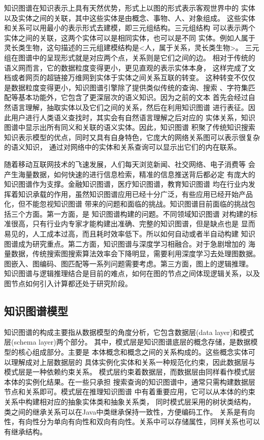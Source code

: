 \documentclass{standalone}
\begin{document}
知识图谱在知识表示上具有天然优势，形式上以图的形式表示客观世界中的
实体以及实体之间的关联，其中这些实体是由概念、事物、人、对象组成。
这些实体和关系可以用最小的表示形式去建模，即三元组结构。三元组结构
可以表示两个实体之间的关联，这两个实体可以是相同实体，也可以是不同
实体。例如人属于灵长类生物，这句描述的三元组建模结构是<人，属于关系，灵长类生物>。
三元组在图谱中的呈现形式就是对应两个点，关系则是它们之间的边。
相对于传统的语义网而言，它的数据粒度变得更小，更见直观的表示实体本身，
这样完成了文档或者网页的超链接万维网到实体于实体之间关系互联的转变。
这种转变不仅仅是数据粒度变得更小，知识图谱引擎除了提供类似传统的查询、搜索
、字符集匹配等基本功能外，它包含了更深层次的语义知识。因为之前的文本
首先会经过自然语言理解，抽取实体以及它们之间的关系，然后在利用知识图谱
进行表征。因此用户进行人类语义查找时，其实会有自然语言理解之后对应的
实体关系，知识图谱中显示出所有同义和关联的语义实体。因此，知识图谱
积聚了传统知识搜索知识表示模型的优点，同时又具有自身特色，它庞大的网络关系图可以表示很复杂的语义知识，
通过对网络中的实体和关系查询可以显示出它们的内在联系。

随着移动互联网技术的飞速发展，人们每天浏览新闻、社交网络、电子消费等
会产生海量数据，如何快速的进行信息检索，精准的信息推送背后都必定
有庞大的知识图谱作为支撑。金融知识图谱，医疗知识图谱，教育知识图谱
均在行业内发挥着知识承载的作用，虽然知识图谱应用已经十分广泛，有些应用已经开始产品化，但不能忽视知识图谱
带来的问题和面临的挑战。知识图谱目前面临的挑战包括三个方面。第一方面，是
知识图谱构建的问题。不同领域知识图谱
对构建的标准很高，只有行业内专家才能构建出准确、完整的知识图谱，但是缺点也是
显而易见的，人工成本过高，而且耗时效率低下。所以如何自动或者半自动构建
知识图谱成为研究重点。第二方面，知识图谱与深度学习相融合。对于急剧增加的
海量数据，传统搜索图搜索算法效率会下降明显，需要利用深度学习去处理图数据。
图嵌入、图编码、图匹配等一系列问题需要考虑。第三方面，图上的逻辑推理。
知识图谱与逻辑推理结合是目前的难点，如何在图的节点之间体现逻辑关系，以及
图节点如何引入计算都还处于研究阶段。
\subsection{知识图谱模型}
知识图谱的构成主要指从数据模型的角度分析，它包含数据层(data layer)和模式层(schema layer)两个部分。
其中，模式层是知识图谱底层的概念存储，是数据模型的核心组成部分。主要是
本体概念和概念之间的关系构成的。这些概念实体可以理解成对上层数据层的
具体实例化实体和关系一种规范化约束，因此数据层与模式层是一种依赖约束关系。
模式层约束着数据层，而数据层由同样看作模式层本体的实例化结果。在一些只承担
搜索查询的知识图谱中，通常只需构建数据层节点和关系即可。模式层在推理知识图谱
中有着重要应用，它可以从本体的约束关系中构建相对应的抽象实体类和抽象关系类，
同时模式层采用的树状类结构，类之间的继承关系可以在Java中类继承保持一致性，方便编码工作。
关系是有向性，有向性分为单向有向性和双向有向性。关系中可以存储属性，同样关系也可以
有继承结构。
\end{document}
